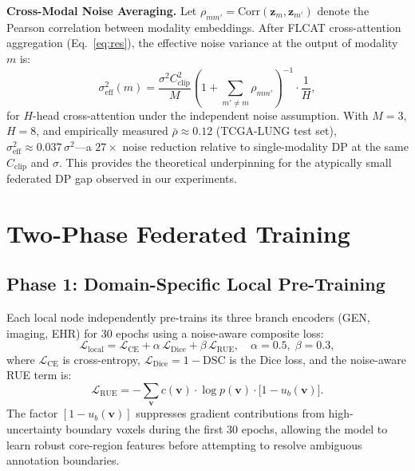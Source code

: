 \documentclass[a4paper,fleqn]{cas-dc}
\begin{document}
\textbf{Cross-Modal Noise Averaging.}
Let $\rho_{mm'} = \mathrm{Corr}(\mathbf{z}_m, \mathbf{z}_{m'})$ denote the
Pearson correlation between modality embeddings. After FLCAT cross-attention
aggregation (Eq.~\ref{eq:res}), the effective noise variance at the output
of modality $m$ is:
\begin{equation}
\sigma_{\mathrm{eff}}^2(m) = \frac{\sigma^2 C_{\mathrm{clip}}^2}{M}
\!\left(1 + \sum_{m'\neq m}\rho_{mm'}\right)^{-1} \cdot \frac{1}{H},
\label{eq:noise_avg}
\end{equation}
for $H$-head cross-attention under the independent noise assumption.
With $M\!=\!3$, $H\!=\!8$, and empirically measured
$\bar\rho\!\approx\!0.12$ (TCGA-LUNG test set),
$\sigma_{\mathrm{eff}}^2\!\approx\!0.037\,\sigma^2$---a $27\!\times$ noise
reduction relative to single-modality DP at the same
$C_{\mathrm{clip}}$ and $\sigma$. This provides the theoretical underpinning
for the atypically small federated DP gap observed in our experiments.

\section{Two-Phase Federated Training}
\label{sec:training}

\subsection{Phase 1: Domain-Specific Local Pre-Training}

Each local node independently pre-trains its three branch encoders (GEN,
imaging, EHR) for 30 epochs using a noise-aware composite loss:
\begin{equation}
\mathcal{L}_{\mathrm{local}} =
\mathcal{L}_{\mathrm{CE}} + \alpha\,\mathcal{L}_{\mathrm{Dice}} +
\beta\,\mathcal{L}_{\mathrm{RUE}},\quad \alpha\!=\!0.5,\;\beta\!=\!0.3,
\label{eq:local_loss}
\end{equation}
where $\mathcal{L}_{\mathrm{CE}}$ is cross-entropy, $\mathcal{L}_{\mathrm{Dice}}
= 1 - \mathrm{DSC}$ is the Dice loss, and the noise-aware RUE term is:
\begin{equation}
\mathcal{L}_{\mathrm{RUE}} =
-\sum_{\mathbf{v}} c(\mathbf{v})\cdot\log p(\mathbf{v})\cdot
\bigl[1 - u_b(\mathbf{v})\bigr].
\label{eq:rue_loss}
\end{equation}
The factor $[1\!-\!u_b(\mathbf{v})]$ suppresses gradient contributions from
high-uncertainty boundary voxels during the first 30 epochs, allowing the
model to learn robust core-region features before attempting to resolve
ambiguous annotation boundaries.
\end{document}
